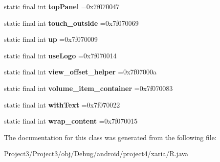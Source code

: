 \begin{DoxyCompactItemize}
static final int {\bfseries top\+Panel} =0x7f070047
\item 
\mbox{\label{classproject4_1_1xaria_1_1R_1_1id_a48eadc5d2878a9d251a4783233291be0}} 
static final int {\bfseries touch\+\_\+outside} =0x7f070069
\item 
\mbox{\label{classproject4_1_1xaria_1_1R_1_1id_a531938726305c0d16b484537e2e94b54}} 
static final int {\bfseries up} =0x7f070009
\item 
\mbox{\label{classproject4_1_1xaria_1_1R_1_1id_a512f0092488e83a4ecc29b861f07c691}} 
static final int {\bfseries use\+Logo} =0x7f070014
\item 
\mbox{\label{classproject4_1_1xaria_1_1R_1_1id_a94cd3fabd25e9a5e1d01dfaaaad136c3}} 
static final int {\bfseries view\+\_\+offset\+\_\+helper} =0x7f07000a
\item 
\mbox{\label{classproject4_1_1xaria_1_1R_1_1id_a68b85051cba17601db930a861865450a}} 
static final int {\bfseries volume\+\_\+item\+\_\+container} =0x7f070083
\item 
\mbox{\label{classproject4_1_1xaria_1_1R_1_1id_a2f61a6e6717aeefb6cfb65cfdd698749}} 
static final int {\bfseries with\+Text} =0x7f070022
\item 
\mbox{\label{classproject4_1_1xaria_1_1R_1_1id_a5dcd6fe0a9fd8547c200657851592dbe}} 
static final int {\bfseries wrap\+\_\+content} =0x7f070015
\end{DoxyCompactItemize}


The documentation for this class was generated from the following file\+:\begin{DoxyCompactItemize}
\item 
Project3/\+Project3/obj/\+Debug/android/project4/xaria/R.\+java\end{DoxyCompactItemize}
